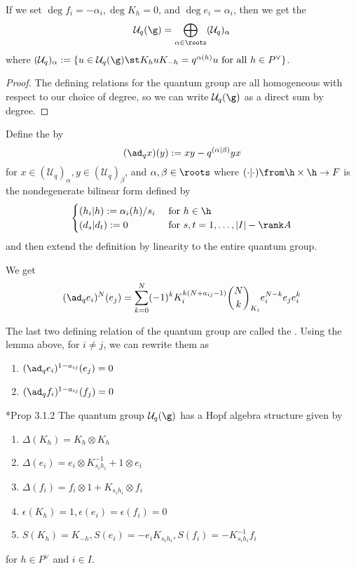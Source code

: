 \documentclass[11pt,leqno,oneside]{amsart}
\numberwithin{thm}{section}
\newcommand{\weightlattice}{P}
\newcommand{\U}{\mathcal{U}}
\newcommand{\qbinom}[3][q]{\binom{#2}{#3}_{#1}}
\begin{document}
\begin{prop}
  If we set \(\deg f_i = -\alpha_i, \deg K_h = 0\), and \(\deg e_i =
  \alpha_i\), then we get the  \[
    \U_q(\g) = \bigoplus_{\alpha \in \roots} (\U_q)_{\alpha}
  \]
  where \((\U_q)_\alpha := \{u \in \U_q(\g) \st K_h u K_{-h} =
  q^{\alpha(h)}u \text{ for all } h \in \weightlattice^\vee\}\).
\end{prop}
\begin{proof}
  The defining relations for the quantum group are all homogeneous
  with respect to our choice of degree, so we can write \(\U_q(\g)\)
  as a direct sum by degree.
\end{proof}
\begin{defn}
  Define the  by \[
    (\ad_q x)(y) := xy - q^{(\alpha | \beta)}yx
  \]
  for \(x \in (\U_q)_\alpha, y \in (\U_q)_\beta\), and \(\alpha,\beta
  \in \roots\) where \((\cdot | \cdot) \from \h \times \h \to F\) is
  the nondegenerate bilinear form
  defined by \[
    \begin{cases}
      (h_i | h) := \alpha_i(h)/s_i & \text{ for }h\in \h\\
      (d_s | d_t) := 0 & \text{ for }s,t = 1,\ldots,|I|-\rank A
    \end{cases}
  \]
  and then extend the definition by linearity to the entire quantum group. 
\end{defn}
\begin{lem}
  We get \[
    (\ad_q e_i)^N(e_j) = \sum_{k=0}^N (-1)^k K_i^{k(N+a_{ij}-1)}
    \qbinom[K_i]{N}{k} e_i^{N-k} e_j e_i^k
  \]
\end{lem}
\begin{rmk}
  The last two defining relation of the quantum group are called the
  . Using the lemma above, for \(i \neq
  j\), we can rewrite
  them as
  \begin{enumerate}
  \item \((\ad_q e_i)^{1-a_{ij}}(e_j) = 0\)
  \item \((\ad_q f_i)^{1-a_{ij}}(f_j) = 0\)
  \end{enumerate}
\end{rmk}
\begin{prop}
  \cite{hong-kang}*{Prop 3.1.2} The quantum group \(\U_q(\g)\) has a
  Hopf algebra structure given by
  \begin{enumerate}
  \item \(\Delta(K_h) = K_h \otimes K_h\)
  \item \(\Delta(e_i) = e_i \otimes K_{s_i h_i}^{-1} + 1 \otimes e_i\)
  \item \(\Delta(f_i) = f_i \otimes 1 + K_{s_i h_i} \otimes f_i\)
  \item \(\epsilon(K_h) = 1, \epsilon(e_i) = \epsilon(f_i) = 0\)
  \item \(S(K_h) = K_{-h}, S(e_i) = - e_i K_{s_i h_i}, S(f_i) = -
    K_{s_i h_i}^{-1} f_i\)
  \end{enumerate}
  for \(h \in \weightlattice^\vee\) and \(i \in I\).
\end{prop}
\end{document}
